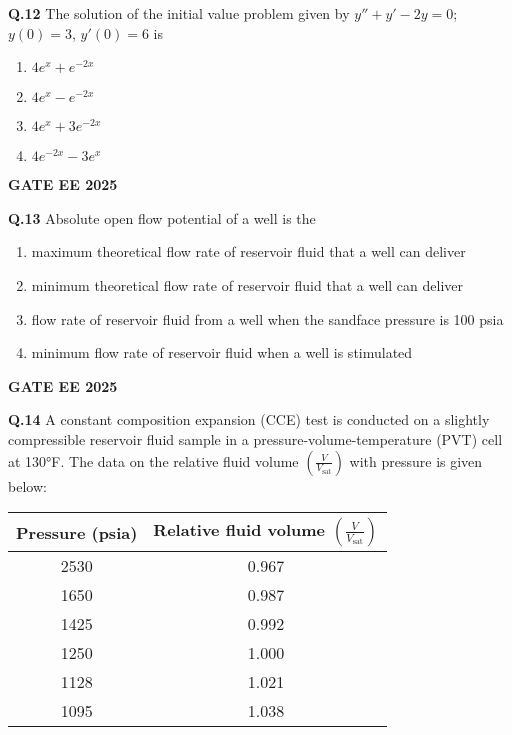 \documentclass{article}
\begin{document}
\vspace{0.5cm}

\textbf{Q.12} The solution of the initial value problem given by $y'' + y' - 2y = 0$; $y(0) = 3$, $y'(0) = 6$ is
\begin{enumerate}[label=(\Alph*)]
    \item $4e^x + e^{-2x}$
    \item $4e^x - e^{-2x}$
    \item $4e^x + 3e^{-2x}$
    \item $4e^{-2x} - 3e^x$
\end{enumerate}
\textbf{GATE EE 2025}

\vspace{0.5cm}

\textbf{Q.13} Absolute open flow potential of a well is the
\begin{enumerate}[label=(\Alph*)]
    \item maximum theoretical flow rate of reservoir fluid that a well can deliver
    \item minimum theoretical flow rate of reservoir fluid that a well can deliver
    \item flow rate of reservoir fluid from a well when the sandface pressure is 100 psia
    \item minimum flow rate of reservoir fluid when a well is stimulated
\end{enumerate}
\textbf{GATE EE 2025}

\vspace{0.5cm}

\textbf{Q.14} A constant composition expansion (CCE) test is conducted on a slightly compressible reservoir fluid sample in a pressure-volume-temperature (PVT) cell at 130°F. The data on the relative fluid volume $\left(\frac{V}{V_{\text{sat}}}\right)$ with pressure is given below:

\begin{center}
\begin{tabular}{|c|c|}
\hline
Pressure (psia) & Relative fluid volume $\left(\frac{V}{V_{\text{sat}}}\right)$ \\
\hline
2530 & 0.967 \\
1650 & 0.987 \\
1425 & 0.992 \\
1250 & 1.000 \\
1128 & 1.021 \\
1095 & 1.038 \\
\hline
\end{tabular}
\end{center}
\end{document}
